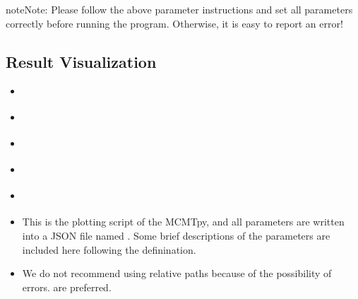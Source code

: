 \documentclass[a4paper,10pt,english,openany]{sphinxmanual}
\begin{document}
\begin{sphinxadmonition}{note}{Note:}
Please follow the above parameter instructions and set all parameters correctly before running the program.
Otherwise, it is easy to report an error!
\end{sphinxadmonition}


\subsection{Result Visualization}
\label{\detokenize{tutorials/S5_Plot_Result:result-visualization}}\label{\detokenize{tutorials/S5_Plot_Result::doc}}
\begin{sphinxShadowBox}
\begin{itemize}
\item {} 
\label{\detokenize{tutorials/S5_Plot_Result:id1}}{\hyperref[\detokenize{tutorials/S5_Plot_Result:path}]{}}

\item {} 
\label{\detokenize{tutorials/S5_Plot_Result:id2}}{\hyperref[\detokenize{tutorials/S5_Plot_Result:hist}]{}}

\item {} 
\label{\detokenize{tutorials/S5_Plot_Result:id3}}{\hyperref[\detokenize{tutorials/S5_Plot_Result:misfit}]{}}

\item {} 
\label{\detokenize{tutorials/S5_Plot_Result:id4}}{\hyperref[\detokenize{tutorials/S5_Plot_Result:waveform}]{}}

\item {} 
\label{\detokenize{tutorials/S5_Plot_Result:id5}}{\hyperref[\detokenize{tutorials/S5_Plot_Result:example}]{}}

\end{itemize}
\end{sphinxShadowBox}
\begin{itemize}
\item {} 
This is the plotting script of the MCMTpy, and all parameters are written into a JSON file named .
Some brief descriptions of the parameters are included here following the definination.

\item {} 
We do not recommend using relative paths because of the possibility of errors.  are preferred.

\end{itemize}
\end{document}
